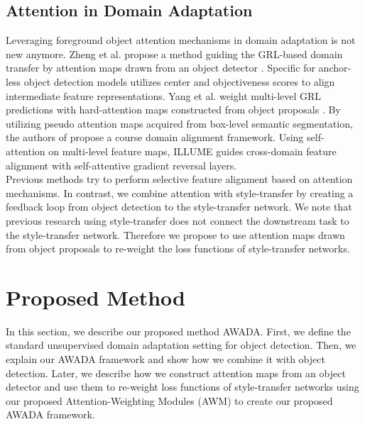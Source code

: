 \documentclass[10pt,twocolumn,letterpaper]{article}
\begin{document}
\subsection{Attention in Domain Adaptation}
Leveraging foreground object attention mechanisms in domain adaptation is not new anymore. Zheng et al. propose a method guiding the GRL-based domain transfer by attention maps drawn from an object detector \cite{CTF}. Specific for anchor-less object detection models \cite{EveryPixelMatters} utilizes center and objectiveness scores to align intermediate feature representations. Yang et al. weight multi-level GRL predictions with hard-attention maps constructed from object proposals \cite{FFDA}. By utilizing pseudo attention maps acquired from box-level semantic segmentation, the authors of \cite{C2FDA} propose a course domain alignment framework. Using self-attention on multi-level feature maps, ILLUME \cite{ILLUME} guides cross-domain feature alignment with self-attentive gradient reversal layers. \\
Previous methods try to perform selective feature alignment based on attention mechanisms. In contrast, we combine attention with style-transfer by creating a feedback loop from object detection to the style-transfer network. We note that previous research using style-transfer does not connect the downstream task to the style-transfer network. Therefore we propose to use attention maps drawn from object proposals to re-weight the loss functions of style-transfer networks.

\section{Proposed Method}
In this section, we describe our proposed method AWADA. First, we define the standard unsupervised domain adaptation setting for object detection. Then, we explain our AWADA framework and show how we combine it with object detection. Later, we describe how we construct attention maps from an object detector and use them to re-weight loss functions of style-transfer networks using our proposed Attention-Weighting Modules (AWM) to create our proposed AWADA framework.
\end{document}
